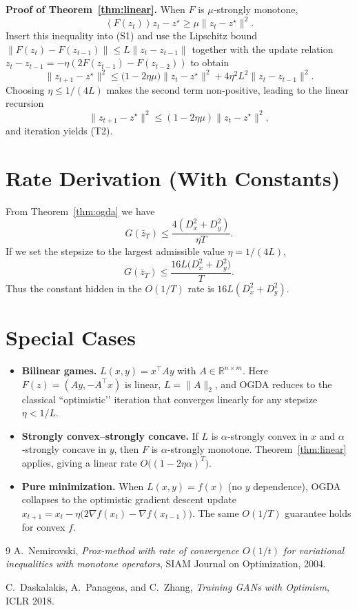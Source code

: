 \documentclass[11pt]{article}
\newcommand{\inner}[1]{\left\langle#1\right\rangle}
\newcommand{\R}{\mathbb{R}}
\begin{document}
\bigskip
\noindent\textbf{Proof of Theorem~\ref{thm:linear}.}  
When $F$ is $\mu$‑strongly monotone,
\[
\inner{F(z_t)}{z_t-z^\star}\ge\mu\|z_t-z^\star\|^2.
\]
Insert this inequality into (S1) and use the Lipschitz bound $\|F(z_t)-F(z_{t-1})\|\le L\|z_t-z_{t-1}\|$ together with the update relation $z_t-z_{t-1}=-\eta(2F(z_{t-1})-F(z_{t-2}))$ to obtain
\[
\|z_{t+1}-z^\star\|^2\le\bigl(1-2\eta\mu\bigr)\|z_t-z^\star\|^2+4\eta^2L^2\|z_t-z_{t-1}\|^2.
\]
Choosing $\eta\le 1/(4L)$ makes the second term non‑positive, leading to the linear recursion
\[
\|z_{t+1}-z^\star\|^2\le(1-2\eta\mu)\|z_t-z^\star\|^2,
\]
and iteration yields (T2). \hfill\qedsymbol

\section*{Rate Derivation (With Constants)}
From Theorem~\ref{thm:ogda} we have
\[
G(\bar z_T)\le\frac{4(D_x^2+D_y^2)}{\eta T}.
\]
If we set the stepsize to the largest admissible value $\eta=1/(4L)$,
\[
G(\bar z_T)\le\frac{16L\bigl(D_x^2+D_y^2\bigr)}{T}.
\]
Thus the constant hidden in the $O(1/T)$ rate is $16L(D_x^2+D_y^2)$.

\section*{Special Cases}
\begin{itemize}
\item \textbf{Bilinear games.} $L(x,y)=x^\top Ay$ with $A\in\R^{n\times m}$. Here $F(z)=(Ay,-A^\top x)$ is linear, $L=\|A\|_2$, and OGDA reduces to the classical “optimistic’’ iteration that converges linearly for any stepsize $\eta<1/L$.
\item \textbf{Strongly convex–strongly concave.} If $L$ is $\alpha$‑strongly convex in $x$ and $\alpha$‑strongly concave in $y$, then $F$ is $\alpha$‑strongly monotone. Theorem~\ref{thm:linear} applies, giving a linear rate $O\!\bigl((1-2\eta\alpha)^T\bigr)$.
\item \textbf{Pure minimization.} When $L(x,y)=f(x)$ (no $y$ dependence), OGDA collapses to the optimistic gradient descent update $x_{t+1}=x_t-\eta\bigl(2\nabla f(x_t)-\nabla f(x_{t-1})\bigr)$. The same $O(1/T)$ guarantee holds for convex $f$.
\end{itemize}

\begin{thebibliography}{9}
A.~Nemirovski, \emph{Prox-method with rate of convergence $O(1/t)$ for variational inequalities with monotone operators}, SIAM Journal on Optimization, 2004.

C.~Daskalakis, A.~Panageas, and C.~Zhang, \emph{Training GANs with Optimism}, ICLR 2018.
\end{thebibliography}
\end{document}
